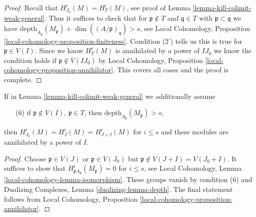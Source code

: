 \begin{proof}
Recall that $H^i_{J_0}(M) = H^i_T(M)$, see proof of
Lemma \ref{lemma-kill-colimit-weak-general}. Thus it suffices to
check that for $\mathfrak p \not \in T$ and $\mathfrak q \in T$
with $\mathfrak p \subset \mathfrak q$ we have
$\text{depth}_{A_\mathfrak p}(M_\mathfrak p) +
\dim((A/\mathfrak p)_\mathfrak q) > s$, see Local Cohomology,
Proposition \ref{local-cohomology-proposition-finiteness}.
Condition (2') tells us this is true for $\mathfrak p \in V(I)$.
Since we know $H^i_T(M)$ is annihilated by a power of $IJ_0$
we know the condition holds if $\mathfrak p \not \in V(IJ_0)$
by Local Cohomology, Proposition \ref{local-cohomology-proposition-annihilator}.
This covers all cases and the proof is complete.
\end{proof}

\begin{lemma}
\label{lemma-kill-colimit-support-general}
If in Lemma \ref{lemma-kill-colimit-weak-general} we additionally assume
\begin{enumerate}
\item[(6)] if $\mathfrak p \not \in V(I)$, $\mathfrak p \in T$, then
$\text{depth}_{A_\mathfrak p}(M_\mathfrak p) > s$,
\end{enumerate}
then $H^i_{J_0}(M) = H^i_J(M) = H^i_{J + I}(M)$ for $i \leq s$ and these
modules are annihilated by a power of $I$.
\end{lemma}

\begin{proof}
Choose $\mathfrak p \in V(J)$ or $\mathfrak p \in V(J_0)$ but
$\mathfrak p \not \in V(J + I) = V(J_0 + I)$.
It suffices to show that $H^i_{\mathfrak pA_\mathfrak p}(M_\mathfrak p) = 0$
for $i \leq s$, see
Local Cohomology, Lemma \ref{local-cohomology-lemma-isomorphism}.
These groups vanish by condition (6) and
Dualizing Complexes, Lemma \ref{dualizing-lemma-depth}.
The final statement follows from
Local Cohomology, Proposition \ref{local-cohomology-proposition-annihilator}.
\end{proof}


